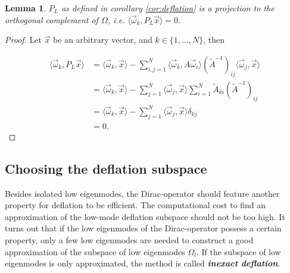 \documentclass{article}
\theoremstyle{plain} %
\newtheorem{lemma}[theorem]{Lemma}
\theoremstyle{convention} %
\theoremstyle{remark} %
\def\df#1{\textbf{\textit{#1}}}
\numberwithin{equation}{section}
\begin{document}

\begin{lemma}

$P_L$ as defined in corollary \ref{cor:deflation} is a projection to the orthogonal complement of $\Omega$, i.e. $\langle \vec{\omega}_k, P_L \vec{x} \rangle = 0$.

\end{lemma}

\begin{proof}

Let $\vec{x}$ be an arbitrary vector, and $k \in \{1, \dots, N\}$, then

\begin{align*}
    \langle \vec{\omega}_k, P_L \vec{x} \rangle &= \langle \vec{\omega}_k, \vec{x} \rangle - \sum_{i,j=1}^N \langle \vec{\omega}_k, A \vec{\omega}_i \rangle (\widetilde{A}^{-1})_{ij} \langle \vec{\omega}_j, \vec{x} \rangle \\
    &= \langle \vec{\omega}_k, \vec{x} \rangle - \sum_{j=1}^N \langle \vec{\omega}_j, \vec{x} \rangle \sum_{i=1}^N \widetilde{A}_{ki} (\widetilde{A}^{-1})_{ij} \\
    &= \langle \vec{\omega}_k, \vec{x} \rangle - \sum_{j=1}^N \langle \vec{\omega}_j, \vec{x} \rangle \delta_{kj} \\
    &= 0.
\end{align*}

\end{proof}

\subsection{Choosing the deflation subspace}

\label{sec:dfl_subspace}

Besides isolated low eigenmodes, the Dirac-operator should feature another property for deflation to be efficient. The computational cost to find an approximation of the low-mode deflation subspace should not be too high. It turns out that if the low eigenmodes of the Dirac-operator possess a certain property, only a few low eigenmodes are needed to construct a good approximation of the subspace of low eigenmodes $\Omega_l$. If the subspace of low eigenmodes is only approximated, the method is called \df{inexact deflation}.
\end{document}
